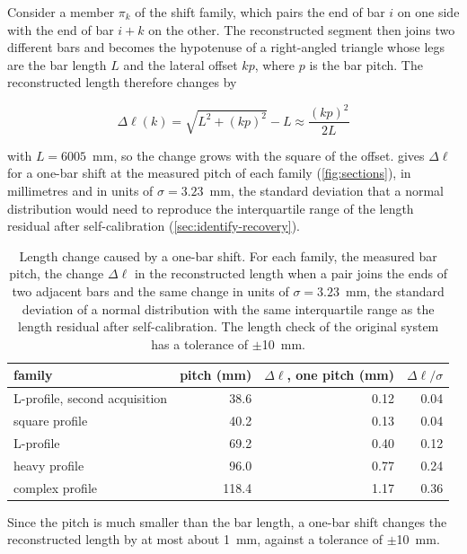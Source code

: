 \documentclass[a4paper, 12pt, twoside]{book}
\begin{document}
Consider a member $\pi_k$ of the shift family, which pairs the end of bar $i$ on one side with the end of bar $i+k$ on the other. The reconstructed segment then joins two different bars and becomes the hypotenuse of a right-angled triangle whose legs are the bar length $L$ and the lateral offset $kp$, where $p$ is the bar pitch. The reconstructed length therefore changes by

\begin{equation}
\Delta\ell(k) = \sqrt{L^2 + (kp)^2} - L \approx \frac{(kp)^2}{2L}
\label{eq:length-change}
\end{equation}

with $L = 6005$~mm, so the change grows with the square of the offset.  gives $\Delta\ell$ for a one-bar shift at the measured pitch of each family (\cref{fig:sections}), in millimetres and in units of $\sigma = 3.23$~mm, the standard deviation that a normal distribution would need to reproduce the interquartile range of the length residual after self-calibration (\cref{sec:identify-recovery}).

\begin{table}[htbp]
\centering
\caption[Length change caused by a one-bar shift]{Length change caused by a one-bar shift. For each family, the measured bar pitch, the change $\Delta\ell$ in the reconstructed length when a pair joins the ends of two adjacent bars and the same change in units of $\sigma = 3.23$~mm, the standard deviation of a normal distribution with the same interquartile range as the length residual after self-calibration. The length check of the original system has a tolerance of $\pm$10~mm.}
\label{tab:length-change}
\begin{tabular}{@{}lrrr@{}}
\toprule
family & pitch (mm) & $\Delta\ell$, one pitch (mm) & $\Delta\ell / \sigma$ \\
\midrule
L-profile, second acquisition & 38.6 & 0.12 & 0.04 \\
square profile & 40.2 & 0.13 & 0.04 \\
L-profile & 69.2 & 0.40 & 0.12 \\
heavy profile & 96.0 & 0.77 & 0.24 \\
complex profile & 118.4 & 1.17 & 0.36 \\
\bottomrule
\end{tabular}
\end{table}

Since the pitch is much smaller than the bar length, a one-bar shift changes the reconstructed length by at most about 1~mm, against a tolerance of $\pm$10~mm.
\end{document}
